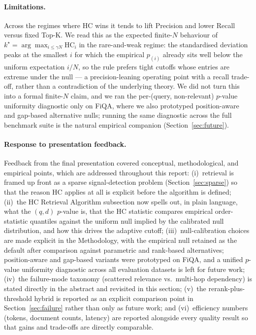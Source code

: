 \documentclass[letterpaper]{article}
\begin{document}
\paragraph{Limitations.} Across the regimes where HC wins it tends to
lift Precision and lower Recall versus fixed Top-K. We read this as
the expected finite-$N$ behaviour of
$k^\star = \arg\max_{i \le \gamma N} \mathrm{HC}_i$ in the
rare-and-weak regime: the standardised deviation peaks at the
smallest $i$ for which the empirical $p_{(i)}$ already sits well
below the uniform expectation $i/N$, so the rule prefers tight
cutoffs whose entries are extreme under the null --- a precision-leaning
operating point with a recall trade-off, rather than a contradiction
of the underlying theory. We did not turn this into a formal
finite-$N$ claim, and we ran the per-(query, non-relevant) $p$-value
uniformity diagnostic only on FiQA, where we also prototyped
position-aware and gap-based alternative nulls; running the same
diagnostic across the full benchmark suite is the natural empirical
companion (Section~\ref{sec:future}).

\paragraph{Response to presentation feedback.}
Feedback from the final presentation covered conceptual,
methodological, and empirical points, which are addressed throughout
this report: (i)~retrieval is framed up front as a sparse
signal-detection problem (Section~\ref{sec:sparse}) so that the
reason HC applies at all is explicit before the algorithm is defined;
(ii)~the HC Retrieval Algorithm subsection now spells out, in plain
language, what the $(q,d)$ $p$-value is, that the HC statistic
compares empirical order-statistic quantiles against the uniform null
implied by the calibrated null distribution, and how this drives the
adaptive cutoff; (iii)~null-calibration choices are made explicit in
the Methodology, with the empirical null retained as the default
after comparison against parametric and rank-based alternatives;
position-aware and gap-based variants were prototyped on FiQA, and
a unified $p$-value uniformity diagnostic across all evaluation
datasets is left for future work;
(iv)~the failure-mode taxonomy (scattered relevance vs.\ multi-hop
dependency) is stated directly in the abstract and revisited in this
section; (v)~the rerank-plus-threshold hybrid is reported as an
explicit comparison point in Section~\ref{sec:failure} rather than
only as future work; and (vi)~efficiency numbers (tokens, document
counts, latency) are reported alongside every quality result so that
gains and trade-offs are directly comparable.
\end{document}
